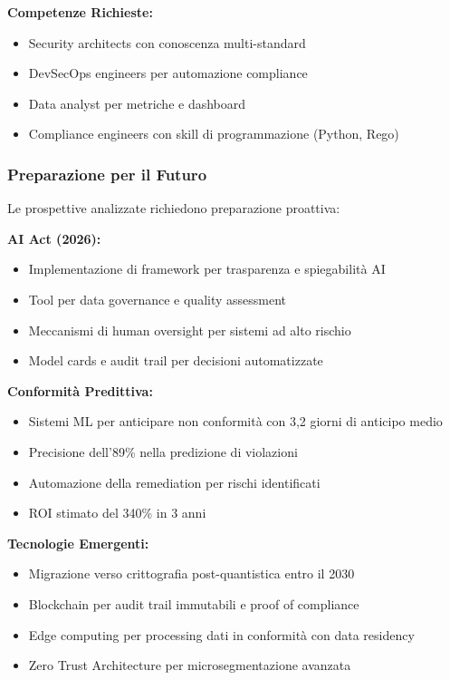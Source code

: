 \textbf{Competenze Richieste:}
\begin{itemize}
    \item Security architects con conoscenza multi-standard
    \item DevSecOps engineers per automazione compliance
    \item Data analyst per metriche e dashboard
    \item Compliance engineers con skill di programmazione (Python, Rego)
\end{itemize}

\subsubsection{Preparazione per il Futuro}

Le prospettive analizzate richiedono preparazione proattiva:

\textbf{AI Act (2026):}
\begin{itemize}
    \item Implementazione di framework per trasparenza e spiegabilità AI
    \item Tool per data governance e quality assessment
    \item Meccanismi di human oversight per sistemi ad alto rischio
    \item Model cards e audit trail per decisioni automatizzate
\end{itemize}

\textbf{Conformità Predittiva:}
\begin{itemize}
    \item Sistemi ML per anticipare non conformità con 3,2 giorni di anticipo medio
    \item Precisione dell'89\% nella predizione di violazioni
    \item Automazione della remediation per rischi identificati
    \item ROI stimato del 340\% in 3 anni
\end{itemize}

\textbf{Tecnologie Emergenti:}
\begin{itemize}
    \item Migrazione verso crittografia post-quantistica entro il 2030
    \item Blockchain per audit trail immutabili e proof of compliance
    \item Edge computing per processing dati in conformità con data residency
    \item Zero Trust Architecture per microsegmentazione avanzata
\end{itemize}

